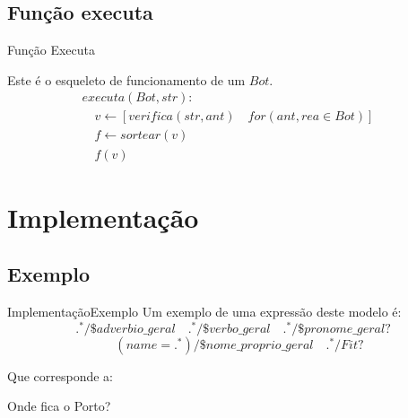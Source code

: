 \documentclass{beamer}
\begin{document}

\subsection{Função executa}

\begin{frame}{Função Executa}

\hspace{11pt} Este é o esqueleto de funcionamento de um $Bot$.\\

\begin{align*}
&executa(Bot, str): && \\
& \quad v \leftarrow [ verifica(str, ant) \quad for(ant, rea \in Bot) ] && \\
& \quad f \leftarrow sortear(v) && \\
& \quad f(v) &&
\end{align*}

\end{frame}


\section{Implementação}

\subsection{Exemplo}
\begin{frame}{Implementação}{Exemplo}
Um exemplo de uma expressão deste modelo é: \\

$$
.^* / \$adverbio\_geral    \quad     .^* / \$verbo\_geral    \quad    .^*/\$pronome\_geral?
$$
$$
\quad (name=.^*) / \$nome\_proprio\_geral \quad  .^*/ Fit ?
$$

\vspace{5mm}
Que corresponde a:

\begin{center}Onde fica o Porto?\end{center}

\end{frame}
\end{document}
